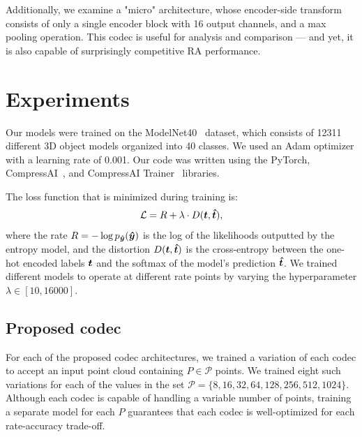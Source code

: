 Additionally, we examine a "micro" architecture, whose encoder-side transform consists of only a single encoder block with 16 output channels, and a max pooling operation.
This codec is useful for analysis and comparison --- and yet, it is also capable of surprisingly competitive RA performance.




\section{Experiments}
\label{sec:experiments}

Our models were trained on the ModelNet40~\cite{wu20143d} dataset, which consists of 12311 different 3D object models organized into 40 classes.
We used an Adam optimizer with a learning rate of 0.001.
Our code was written using the PyTorch, CompressAI~\cite{begaint2020compressai}, and CompressAI Trainer~\cite{ulhaq2022compressaitrainer} libraries.

The loss function that is minimized during training is:
\[
  \mathcal{L} = R + \lambda \cdot D({\boldsymbol{t}}, {\boldsymbol{\hat{t}}}),
\]
%
where the rate $R = -\log p_{{\boldsymbol{\hat{y}}}}({\boldsymbol{\hat{y}}})$ is the log of the likelihoods outputted by the entropy model, and
the distortion $D({\boldsymbol{t}}, {\boldsymbol{\hat{t}}})$ is the cross-entropy between the one-hot encoded labels ${\boldsymbol{t}}$ and the softmax of the model's prediction ${\boldsymbol{\hat{t}}}$.
We trained different models to operate at different rate points by varying the hyperparameter $\lambda \in [10, 16000]$.



\subsection{Proposed codec}

For each of the proposed codec architectures, we trained a variation of each codec to accept an input point cloud containing $P \in \mathcal{P}$ points.
We trained eight such variations for each of the values in the set
$\mathcal{P} = \{ 8, 16, 32, 64, 128, 256, 512, 1024 \}$.
Although each codec is capable of handling a variable number of points,
training a separate model for each $P$ guarantees that each codec is well-optimized for each rate-accuracy trade-off.



